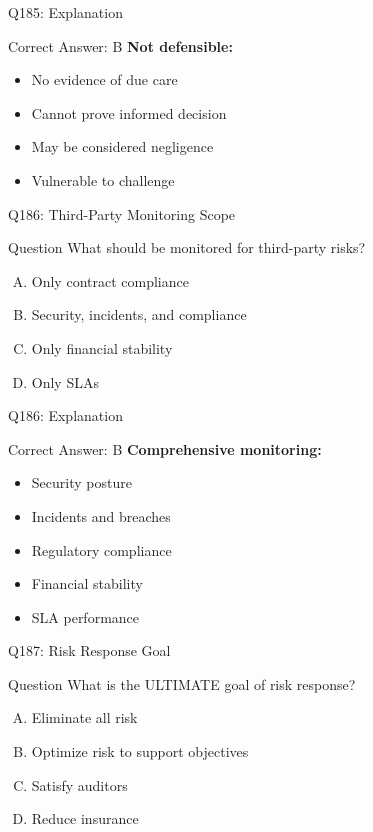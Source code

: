 \documentclass{beamer}
\begin{document}
	\begin{frame}{Q185: Explanation}
		\begin{block}{Correct Answer: B}
			\textbf{Not defensible:}
			\begin{itemize}
				\item No evidence of due care
				\item Cannot prove informed decision
				\item May be considered negligence
				\item Vulnerable to challenge
			\end{itemize}
		\end{block}
	\end{frame}
	
	\begin{frame}{Q186: Third-Party Monitoring Scope}
		\begin{block}{Question}
			What should be monitored for third-party risks?
		\end{block}
		\begin{enumerate}[(A)]
			\item Only contract compliance
			\item Security, incidents, and compliance
			\item Only financial stability
			\item Only SLAs
		\end{enumerate}
	\end{frame}
	
	\begin{frame}{Q186: Explanation}
		\begin{block}{Correct Answer: B}
			\textbf{Comprehensive monitoring:}
			\begin{itemize}
				\item Security posture
				\item Incidents and breaches
				\item Regulatory compliance
				\item Financial stability
				\item SLA performance
			\end{itemize}
		\end{block}
	\end{frame}
	
	\begin{frame}{Q187: Risk Response Goal}
		\begin{block}{Question}
			What is the ULTIMATE goal of risk response?
		\end{block}
		\begin{enumerate}[(A)]
			\item Eliminate all risk
			\item Optimize risk to support objectives
			\item Satisfy auditors
			\item Reduce insurance
		\end{enumerate}
	\end{frame}
	
\end{document}
